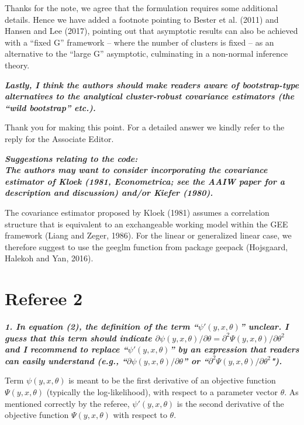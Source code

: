 \documentclass[10pt,a4paper]{article}
\begin{document}
\medskip

Thanks for the note, we agree that the formulation requires some additional details.
Hence we have added a footnote pointing to Bester et al. (2011) and Hansen and Lee (2017), pointing out that asymptotic results can also be achieved with a ``fixed G'' framework -- where the number of clusters is
fixed -- as an alternative to the ``large G'' asymptotic, culminating in a non-normal inference theory.

\medskip

\textbf{\textit{Lastly, I think the authors should make readers aware of bootstrap-type alternatives to the analytical cluster-robust covariance estimators (the ``wild bootstrap'' etc.).}}

\medskip

Thank you for making this point. For a detailed answer we kindly refer to the reply for the Associate Editor. 

\medskip

\textbf{\textit{Suggestions relating to the code:
\\
The authors may want to consider incorporating the  covariance estimator of Kloek (1981, Econometrica; see the AAIW paper for a description and discussion) and/or Kiefer (1980).}}

\medskip

The covariance estimator proposed by Kloek (1981) assumes a correlation structure that is equivalent to an exchangeable working model within the GEE framework (Liang and Zeger, 1986).
For the linear or generalized linear case, we therefore suggest to use the geeglm function from package geepack (Hojsgaard, Halekoh and Yan, 2016).

\section*{Referee 2}

\textbf{\textit{1. In equation (2), the definition of the term ``$\psi'(y, x, \theta)$'' unclear.
I guess that this term should indicate $\partial \psi(y, x, \theta)/\partial\theta = \partial^2\Psi(y, x, \theta)/\partial\theta^2$ and I recommend to replace ``$\psi'(y, x, \theta)$''
by an expression that readers can easily understand
(e.g., ``$\partial \psi(y, x, \theta)/\partial\theta$'' or ``$\partial^2\Psi(y, x, \theta)/\partial\theta^2$").}}

\medskip

Term $\psi(y, x, \theta)$ is meant to be the first derivative of an objective function $\Psi(y, x, \theta)$ (typically the log-likelihood), with respect to a parameter vector $\theta$. As mentioned correctly by the referee, $\psi'(y, x, \theta)$ is the second derivative of the objective function $\Psi(y, x, \theta)$ with respect to $\theta$.
\end{document}

